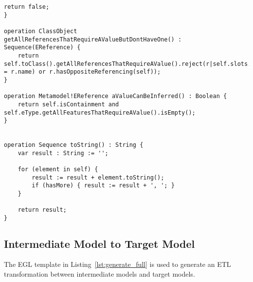 \begin{lstlisting}[caption=Syntactic and Conformance Constraints in EVL., label=lst:constraints_full, language=EVL]
	return false;
}

operation ClassObject getAllReferencesThatRequireAValueButDontHaveOne() : Sequence(EReference) {
    return self.toClass().getAllReferencesThatRequireAValue().reject(r|self.slots.exists(s|s.feature = r.name) or r.hasOppositeReferencing(self));
}

operation Metamodel!EReference aValueCanBeInferred() : Boolean {
	return self.isContainment and self.eType.getAllFeaturesThatRequireAValue().isEmpty();
}


operation Sequence toString() : String {
	var result : String := '';

	for (element in self) {
		result := result + element.toString();
		if (hasMore) { result := result + ', '; }
	}
	
	return result;
}
\end{lstlisting}


\subsection{Intermediate Model to Target Model}
The EGL template in Listing~\ref{lst:generate_full} is used to generate an ETL transformation between intermediate models and target models.

